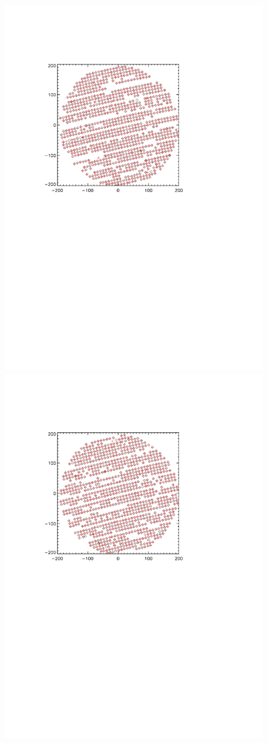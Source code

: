 \begin{figure}
\begin{center}
\includegraphics[trim=2cm 14cm 5cm 4cm, clip=true,width=0.6\linewidth]{Figures/A1_test_positions.pdf}
\includegraphics[trim=2cm 14cm 5cm 4cm, clip=true,width=0.6\linewidth]{Figures/A3_test_positions.pdf}

\end{center}
\end{figure}
